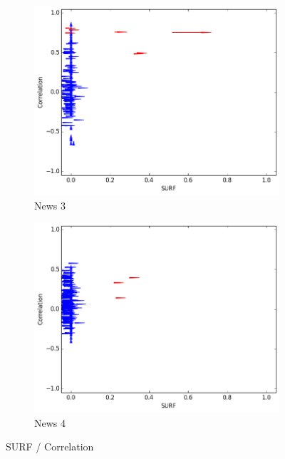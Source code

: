 \documentclass[10pt, journal,twocolumn]{IEEEtran}
\begin{document}
\begin{figure}[!ht]
\begin{subfigure}{.25\textwidth}
\end{subfigure}
\-\\
\begin{subfigure}{.25\textwidth}
  \begin{center}
  \includegraphics[keepaspectratio,width=1\textwidth]{3}\\
  {News 3}
  \end{center}
\end{subfigure}%
\begin{subfigure}{.25\textwidth}
  \begin{center}
  \includegraphics[keepaspectratio,width=1\textwidth]{4}\\
  {News 4}
  \end{center}
\end{subfigure}

\caption{SURF / Correlation}\label{newssurfcorr}
\end{figure}
\end{document}

